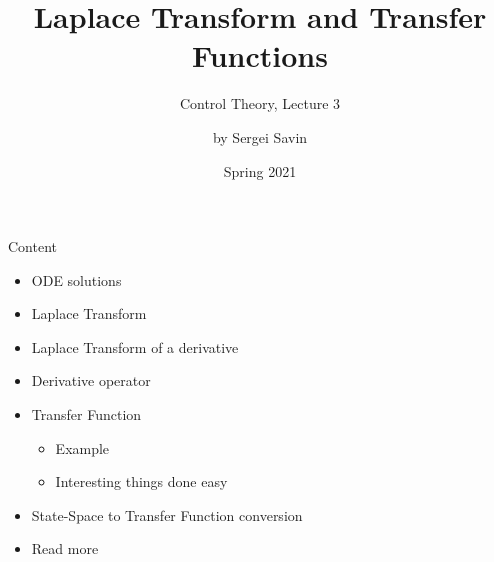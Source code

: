 \documentclass{beamer}
\title{Laplace Transform and Transfer Functions}
\subtitle{Control Theory, Lecture 3}
\author{by Sergei Savin}
\date{Spring 2021}
\begin{document}
\maketitle


\begin{frame}{Content}

\begin{itemize}
\item ODE solutions
\item Laplace Transform
\item Laplace Transform of a derivative
\item Derivative operator
\item Transfer Function
    \begin{itemize}
    \item Example
    \item Interesting things done easy
    \end{itemize}
\item State-Space to Transfer Function conversion
\item Read more
\end{itemize}

\end{frame}
\end{document}
